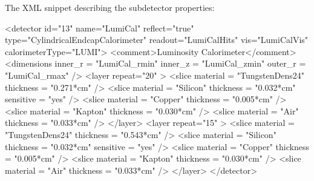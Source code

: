 \documentclass[10pt,a4paper]{article}
\begin{document}
\vspace{0.1cm}
\noindent
The XML snippet describing the subdetector properties:
\begin{code}
  <detector id="13" name="LumiCal" reflect="true" type="CylindricalEndcapCalorimeter" 
            readout="LumiCalHits" vis="LumiCalVis" calorimeterType="LUMI">
    <comment>Luminosity Calorimeter</comment>
    <dimensions inner_r = "LumiCal_rmin" inner_z = "LumiCal_zmin" outer_r = "LumiCal_rmax" />
    <layer repeat="20" >
      <slice material = "TungstenDens24" thickness = "0.271*cm" />
      <slice material = "Silicon" thickness = "0.032*cm" sensitive = "yes" />
      <slice material = "Copper"  thickness = "0.005*cm" />
      <slice material = "Kapton"  thickness = "0.030*cm" />
      <slice material = "Air"     thickness = "0.033*cm" />
    </layer>
    <layer repeat="15" >
      <slice material = "TungstenDens24" thickness = "0.543*cm" />
      <slice material = "Silicon" thickness = "0.032*cm" sensitive = "yes" />
      <slice material = "Copper"  thickness = "0.005*cm" />
      <slice material = "Kapton"  thickness = "0.030*cm" />
      <slice material = "Air"     thickness = "0.033*cm" />
    </layer>
  </detector>
\end{code}
\end{document}
